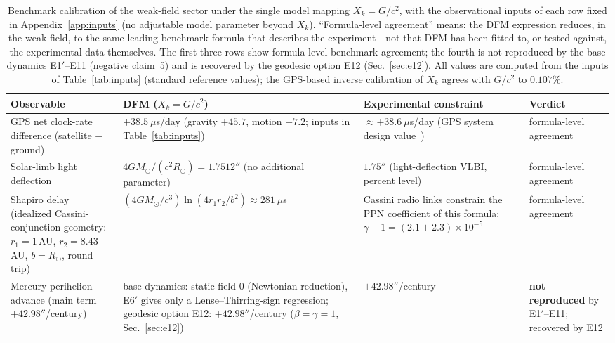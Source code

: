 \documentclass[aps,reprint,amsmath,amssymb,nofootinbib,superscriptaddress,floatfix]{revtex4-2}
\newcommand{\Kt}{X_k}
\begin{document}
\begin{table}[t]
\caption{\label{tab:calib}%
Benchmark calibration of the weak-field sector under the single model
mapping $\Kt = G/c^2$, with the observational inputs of each row fixed
in Appendix~\ref{app:inputs} (no adjustable model parameter beyond
$\Kt$).
``Formula-level agreement'' means: the DFM expression reduces, in the
weak field, to the same leading benchmark formula that describes the
experiment---not that DFM has been fitted to, or tested against, the
experimental data themselves.
The first three rows show formula-level benchmark agreement; the
fourth is not reproduced by the base dynamics E1$'$--E11 (negative
claim~5) and is recovered by the geodesic option E12
(Sec.~\ref{sec:e12}).
All values are computed from the inputs of Table~\ref{tab:inputs}
(standard reference values); the GPS-based inverse calibration of
$\Kt$ agrees with
$G/c^2$ to $0.107\%$.}
\begin{ruledtabular}
\begin{tabular}{p{}p{}p{}p{}}
Observable & DFM ($\Kt = G/c^2$) & Experimental constraint & Verdict \\
\hline
GPS net clock-rate difference (satellite $-$ ground) &
$+38.5\ \mu$s/day (gravity $+45.7$, motion $-7.2$; inputs in
Table~\ref{tab:inputs}) &
$\approx +38.6\ \mu$s/day (GPS system design
value~\cite{Ashby2003}) &
formula-level agreement \\
Solar-limb light deflection &
$4GM_\odot/(c^2R_\odot) = 1.7512''$ (no additional parameter) &
$1.75''$ (light-deflection VLBI, percent level) &
formula-level agreement \\
Shapiro delay (idealized Cassini-conjunction geometry:
$r_1 = 1\,$AU, $r_2 = 8.43\,$AU, $b = R_\odot$, round trip) &
$(4GM_\odot/c^3)\ln(4r_1r_2/b^2) \approx 281\ \mu$s &
Cassini radio links constrain the PPN coefficient of this formula:
$\gamma - 1 = (2.1 \pm 2.3)\times10^{-5}$~\cite{Bertotti2003} &
formula-level agreement \\
Mercury perihelion advance (main term $+42.98''$/century) &
base dynamics: static field $0$ (Newtonian reduction), E6$'$ gives
only a Lense--Thirring-sign regression; geodesic option E12:
$+42.98''$/century ($\beta = \gamma = 1$, Sec.~\ref{sec:e12}) &
$+42.98''$/century &
\textbf{not reproduced} by E1$'$--E11; recovered by E12 \\
\end{tabular}
\end{ruledtabular}
\end{table}
\end{document}
